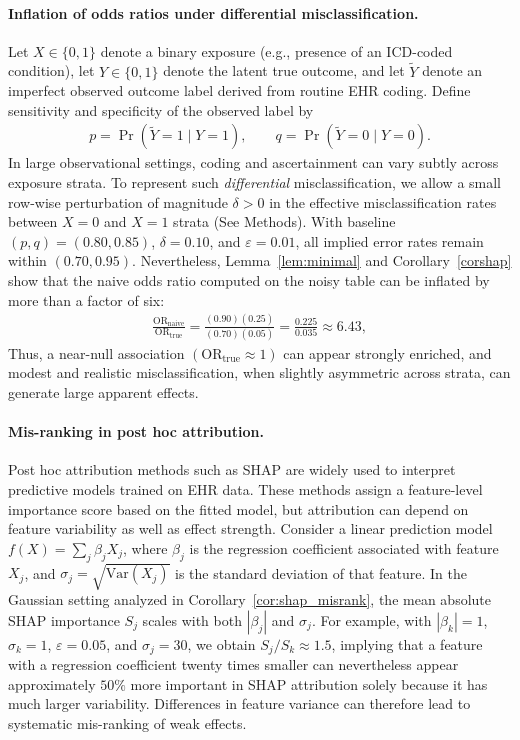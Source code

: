 \documentclass[pdflatex,sn-mathphys-num]{sn-jnl}%
\def\EQSP{3pt}
\newcommand{\cgather}[2][\EQSP]{\begingroup\setlength\abovedisplayskip{#1}\setlength\belowdisplayskip{#1}\begin{gather} #2 \end{gather}\endgroup\noindent}
\theoremstyle{thmstyleone}%
\theoremstyle{thmstyletwo}%
\theoremstyle{thmstylethree}%
\begin{document}
\paragraph{Inflation of odds ratios under differential misclassification.}
Let $X\in\{0,1\}$ denote a binary exposure (e.g., presence of an ICD-coded condition), let $Y\in\{0,1\}$ denote the latent true outcome, and let $\widetilde Y$ denote an imperfect observed outcome label derived from routine EHR coding. Define sensitivity and specificity of the observed label by
\cgather{
p=\Pr(\widetilde Y=1\mid Y=1),\qquad q=\Pr(\widetilde Y=0\mid Y=0).
}
In large observational settings, coding and ascertainment can vary subtly across exposure strata. To represent such \emph{differential} misclassification, we allow a small row-wise perturbation of magnitude $\delta>0$ in the effective misclassification rates between $X=0$ and $X=1$ strata (See Methods). With baseline $(p,q)=(0.80,0.85)$, $\delta=0.10$, and $\varepsilon=0.01$, all implied error rates remain within $(0.70,0.95)$. Nevertheless, Lemma~\ref{lem:minimal} and Corollary~\ref{corshap} show that the naive odds ratio computed on the noisy table can be inflated by more than a factor of six:
\cgather{
\frac{\mathrm{OR}_{\text{naive}}}{\mathrm{OR}_{\text{true}}}
=\frac{(0.90)(0.25)}{(0.70)(0.05)}
=\frac{0.225}{0.035}\approx 6.43,
}
Thus,  a near-null association $(\mathrm{OR}_{\text{true}}\approx 1)$ can appear strongly enriched, and modest and realistic misclassification, when slightly asymmetric across strata, can generate large apparent effects.
\paragraph{Mis-ranking in post hoc attribution.}
Post hoc attribution methods such as SHAP are widely used to interpret predictive models trained on EHR data. These methods assign a feature-level importance score based on the fitted model, but attribution can depend on feature variability as well as effect strength. Consider a linear prediction model $ f(X)=\sum_{j}\beta_j X_j$, 
where $\beta_j$ is the regression coefficient associated with feature $X_j$, and $\sigma_j=\sqrt{\mathrm{Var}(X_j)}$ is the standard deviation of that feature. In the Gaussian setting analyzed in Corollary~\ref{cor:shap_misrank}, the mean absolute SHAP importance $S_j$ scales with both $|\beta_j|$ and $\sigma_j$. For example, with $|\beta_k|=1$, $\sigma_k=1$, $\varepsilon=0.05$, and $\sigma_j=30$, we obtain $S_j/S_k\approx 1.5$, implying that a feature with a regression coefficient twenty times smaller can nevertheless appear approximately $50\%$ more important in SHAP attribution solely because it has much larger variability. Differences in feature variance can therefore lead to systematic mis-ranking of weak effects.
\end{document}

